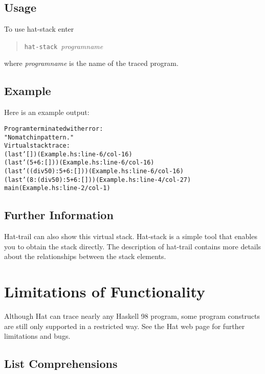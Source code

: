 \documentclass[12pt]{article}
\newcommand{\dashedBox}{\Box\hspace{-9pt}\angle}
\begin{document}
\subsection{Usage}

To use hat-stack enter
\begin{quote}
\texttt{hat-stack}~\emph{programname}
\end{quote}
where \emph{programname} is the name of the traced program.

\subsection{Example}

Here is an example output:
\begin{alltt}
Program terminated with error:
    "No match in pattern."
Virtual stack trace:
    (last' [])                     (Example.hs: line-6/col-16)
    (last' (5+6:[]))               (Example.hs: line-6/col-16)
    (last' ((div 5 0):5+6:[]))     (Example.hs: line-6/col-16)
    (last' (8:(div 5 0):5+6:[]))   (Example.hs: line-4/col-27)
    main                           (Example.hs: line-2/col-1)
\end{alltt}

\subsection{Further Information}

Hat-trail can also show this virtual stack. Hat-stack is a simple
tool that enables you to obtain the stack directly.  The description
of hat-trail contains more details about the relationships between
the stack elements.




\newpage
\section{Limitations of Functionality}

Although Hat can trace nearly any Haskell 98 program, some program
constructs are still only supported in a restricted way. See the Hat
web page for further limitations and bugs.

\subsection{List Comprehensions}
\end{document}
